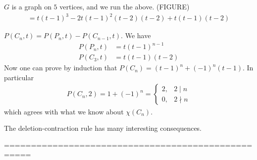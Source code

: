 \begin{example} $G$ is a graph on $5$ vertices, and we run the above.
(FIGURE)
\begin{align*}
= t(t-1)^3-2t(t-1)^2(t-2)(t-2)+t(t-1)(t-2)
\end{align*}
\end{example}
\begin{example}
$P(C_n,t)=P(P_n,t)-P(C_{n-1},t)$. We have
\begin{align*}
P(P_n,t)&= t(t-1)^{n-1}\\
P(C_3,t)&=t(t-1)(t-2)
\end{align*}
Now one can prove by induction that $P(C_n)=(t-1)^n+(-1)^n(t-1)$. In particular
\begin{align*}
P(C_n,2)=1+(-1)^n= \left\lbrace \begin{array}{ll}
2, & 2\mid n\\
0, & 2\nmid n
\end{array}\right.
\end{align*}
which agrees with what we know about $\chi(C_n)$.
\end{example}

The deletion-contraction rule has many interesting consequences. 

===================================================

